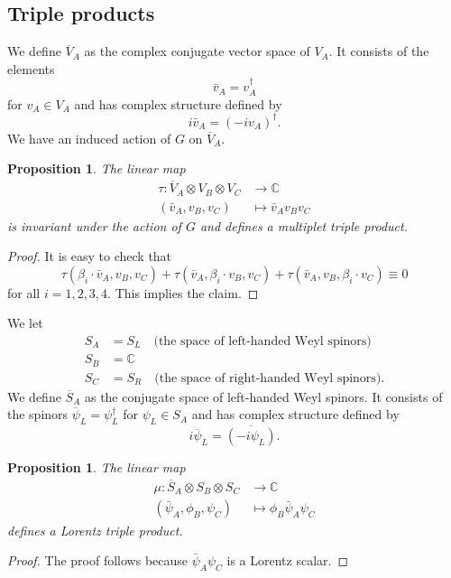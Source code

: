 \documentclass[12pt]{amsart}
\newtheorem{prop}[thm]{Proposition}
\theoremstyle{definition}
\theoremstyle{remark}
\numberwithin{equation}{section}
\begin{document}
\subsection{Triple products}
We define $\overline{V}_A$ as the complex conjugate vector space of $V_A$. It consists of the elements 
\begin{equation*}
\bar{v}_A=v^\dagger_A
\end{equation*}
for $v_A\in V_A$ and has complex structure defined by
\begin{equation*}
i\bar{v}_A=(-iv_A)^\dagger.
\end{equation*}
We have an induced action of $G$ on $\overline{V}_A$.
\begin{prop}\label{prop multiplet triple electroweak}The linear map
\begin{align*}
\tau\colon \overline{V}_A\otimes V_B\otimes V_C&\longrightarrow\mathbb{C}\\
(\bar{v}_A,v_B,v_C)&\longmapsto \bar{v}_Av_Bv_C
\end{align*}
is invariant under the action of $G$ and defines a multiplet triple product.
\end{prop}
\begin{proof}
It is easy to check that
\begin{equation*}
\tau(\beta_i\cdot \bar{v}_A,v_B,v_C)+\tau(\bar{v}_A,\beta_i\cdot v_B,v_C)+\tau(\bar{v}_A,v_B,\beta_i\cdot v_C)\equiv 0
\end{equation*}
for all $i=1,2,3,4$. This implies the claim.
\end{proof}
We let 
\begin{align*}
S_A&=S_L\quad\text{(the space of left-handed Weyl spinors)}\\
S_B&=\mathbb{C}\\
S_C&=S_R\quad \text{(the space of right-handed Weyl spinors).}
\end{align*}
We define $\overline{S}_A$ as the conjugate space of left-handed Weyl spinors. It consists of the spinors $\overline{\psi}_L=\psi_L^\dagger$ for $\psi_L\in S_A$ and has complex structure defined by
\begin{equation*}
i\overline{\psi}_L=\overline{(-i\psi_L)}.
\end{equation*}
\begin{prop}\label{prop lorentz triple electroweak}The linear map
\begin{align*}
\mu\colon \overline{S}_A\otimes S_B\otimes S_C&\longrightarrow\mathbb{C}\\
(\bar{\psi}_A,\phi_B,\psi_C)&\longmapsto \phi_B\bar{\psi}_A\psi_C
\end{align*}
defines a Lorentz triple product.
\end{prop}
\begin{proof}
The proof follows because $\bar{\psi}_A\psi_C$ is a Lorentz scalar.
\end{proof}
\end{document}
